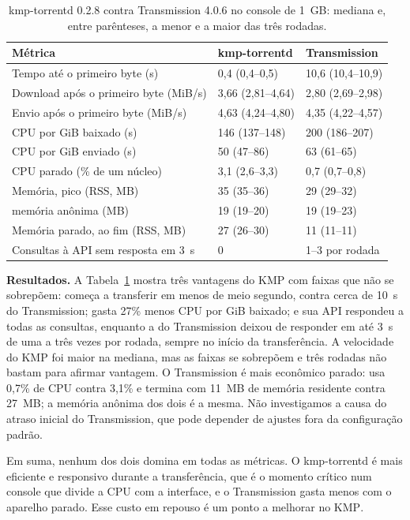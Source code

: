 \documentclass[12pt]{article}
\newcommand{\kmp}{\textsc{KMP}}
\begin{document}
\begin{table}[ht]
\centering
\caption{kmp-torrentd 0.2.8 contra Transmission 4.0.6 no console de 1~GB:
mediana e, entre parênteses, a menor e a maior das três rodadas.}
\label{tab:transmission}
\small
\begin{tabular}{@{}lll@{}}
\toprule
Métrica & kmp-torrentd & Transmission \\
\midrule
Tempo até o primeiro byte (s) & 0,4 (0,4--0,5) & 10,6 (10,4--10,9) \\
Download após o primeiro byte (MiB/s) & 3,66 (2,81--4,64) & 2,80 (2,69--2,98) \\
Envio após o primeiro byte (MiB/s) & 4,63 (4,24--4,80) & 4,35 (4,22--4,57) \\
CPU por GiB baixado (s) & 146 (137--148) & 200 (186--207) \\
CPU por GiB enviado (s) & 50 (47--86) & 63 (61--65) \\
CPU parado (\% de um núcleo) & 3,1 (2,6--3,3) & 0,7 (0,7--0,8) \\
Memória, pico (RSS, MB) & 35 (35--36) & 29 (29--32) \\
\quad memória anônima (MB) & 19 (19--20) & 19 (19--23) \\
Memória parado, ao fim (RSS, MB) & 27 (26--30) & 11 (11--11) \\
Consultas à API sem resposta em 3~s & 0 & 1--3 por rodada \\
\bottomrule
\end{tabular}
\end{table}

\textbf{Resultados.} A Tabela~\ref{tab:transmission} mostra três vantagens do
\kmp{} com faixas que não se sobrepõem: começa a transferir em menos de meio
segundo, contra cerca de 10~s do Transmission; gasta 27\% menos CPU por GiB
baixado; e sua API respondeu a todas as consultas, enquanto a do Transmission
deixou de responder em até 3~s de uma a três vezes por rodada, sempre no início
da transferência. A velocidade do \kmp{} foi maior na mediana, mas as faixas
se sobrepõem e três rodadas não bastam para afirmar vantagem. O Transmission é
mais econômico parado: usa 0,7\% de CPU contra 3,1\% e termina com 11~MB de
memória residente contra 27~MB; a memória anônima dos dois é a mesma. Não
investigamos a causa do atraso inicial do Transmission, que pode depender de
ajustes fora da configuração padrão.

Em suma, nenhum dos dois domina em todas as métricas. O kmp-torrentd é mais
eficiente e responsivo durante a transferência, que é o momento crítico num
console que divide a CPU com a interface, e o Transmission gasta menos com o
aparelho parado. Esse custo em repouso é um ponto a melhorar no \kmp{}.
\end{document}
